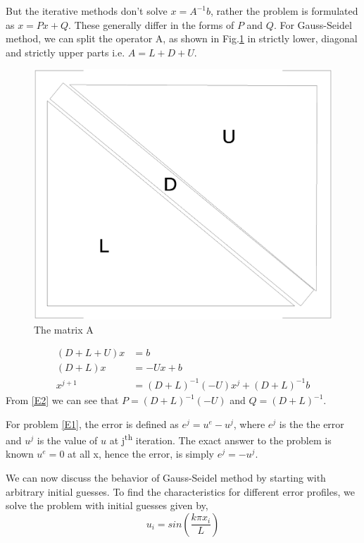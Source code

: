 But the iterative methods don't solve $x = A^{-1} b$, rather the problem is formulated as $x = Px + Q$. These generally differ in the forms of $P$ and $Q$. 
For Gauss-Seidel method, we can split the operator A, as shown in Fig.\ref{Fig:matrix} in strictly lower, diagonal and strictly upper parts i.e. $A = L + D +U$. 
\begin{figure}
 \centering
 \includegraphics[scale=0.2]{mat-A.eps}
 \caption{The matrix A}
 \label{Fig:matrix}
\end{figure}

\begin{equation}
 \begin{align}
  (D +  L + U)x &= b \\
  (D+L)x &= -Ux + b \\
  x^{j+1} &= (D+L)^{-1}(-U) x^j + (D+L)^{-1}b
 \end{align}
\label{E2}
\end{equation}
\vspace{1cm}
From \ref{E2} we can see that $P = (D+L)^{-1}(-U) $ and $ Q = (D+L)^{-1} $. \par

For problem \ref{E1}, the error is defined as $e^j = u^e - u^j$, where $e^j$ is
the the error and $u^j$ is the value of $u$ at j\textsuperscript{th} iteration. The exact answer to the problem is known $u^e = 0$ at all x,
hence the error, is simply  $e^j =  - u^j$. \par
We can now discuss the behavior of Gauss-Seidel method by starting with arbitrary initial guesses. To find the characteristics for different error profiles, we solve the 
problem with initial guesses given by, 
\begin{equation}
 u_i = sin\left(\frac{k\pi x_i}{L}\right)
 \label{E3}
\end{equation}

